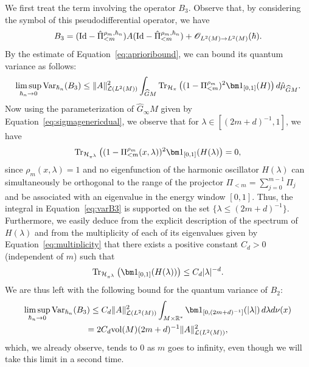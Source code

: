 \documentclass[12pt,a4paper]{amsart}
\theoremstyle{plain}
\theoremstyle{definition}
\theoremstyle{remark}
\numberwithin{equation}{section}
\theoremstyle{definition}
\def\R{{\mathbb R}}%
\def \O{\mathscr{O}}
\def \Ghat{\widehat{G}}
\numberwithin{equation}{section}
\begin{document}
We first treat the term involving the operator $B_3$.
Observe that, by considering the symbol of this pseudodifferential operator, we have
\begin{equation*}
    B_3 = ({\rm Id}-\hat{\Pi}_{<m}^{\rho_m,\hbar_n})A({\rm Id}-\hat{\Pi}_{<m}^{\rho_m,\hbar_n}) + \O_{L^2(M)\rightarrow L^2(M)}(\hbar).
\end{equation*}
By the estimate of Equation~\eqref{eq:aprioribound}, we can bound its quantum variance as follows:
\begin{equation}
    \label{eq:varB3}
    \limsup_{\hbar_n\rightarrow 0}{\rm Var}_{\hbar_n}(B_3)
    \leq \|A\|_{\mathcal{L}(L^2(M))}^2\int_{\Ghat M} {\rm Tr}_{\mathcal{H}_\pi}\left((1-\Pi_{<m}^{\rho_m})^2{\bm 1}_{[0,1]}(H)\right)d\hat{\mu}_{\Ghat M}.
\end{equation}
Now using the parameterization of $\Ghat_\infty M$ given by Equation~\eqref{eq:sigmagenericdual}, we observe that for $\lambda\in [(2m+d)^{-1},1]$, we have
\begin{equation*}
    {\rm Tr}_{\mathcal{H}_{\pi^\lambda}}\left((1-\Pi_{<m}^{\rho_m}(x,\lambda))^2{\bm 1}_{[0,1]}(H(\lambda)\right) = 0,
\end{equation*}
since $\rho_m(x,\lambda) = 1$ and no eigenfunction of the harmonic oscillator $H(\lambda)$ can simultaneously be orthogonal to the range of the projector $\Pi_{<m} = \sum_{j=0}^{m-1}\Pi_j$ and be associated with an eigenvalue in the energy window $[0,1]$. Thus, the integral in Equation~\eqref{eq:varB3} is supported on the set $\{\lambda\leq (2m+d)^{-1}\}$. Furthermore, we easily deduce from the explicit description of the spectrum of $H(\lambda)$ and from the multiplicity of each of its eigenvalues given by Equation~\eqref{eq:multiplicity} that there exists a positive constant $C_d>0$ (independent of $m$) such that
\begin{equation}
    \label{eq:estimatetraceH}
    {\rm Tr}_{\mathcal{H}_{\pi^\lambda}}\left({\bm 1}_{[0,1]}(H(\lambda))\right)\leq C_d |\lambda|^{-d}.
\end{equation}
We are thus left with the following bound for the quantum variance of $B_2$:
\begin{multline}
    \label{eq:firstestimateB3}
    \limsup_{\hbar_n\rightarrow 0}{\rm Var}_{\hbar_n}(B_3)\leq C_d \|A\|_{\mathcal{L}(L^2(M))}^2\int_{M\times \R^*} {\bm 1}_{[0,(2m+d)^{-1}]}(|\lambda|)\,d\lambda d\nu(x)\\
    =  2C_d{\rm vol}(M)(2m+d)^{-1} \|A\|_{\mathcal{L}(L^2(M))}^2,
\end{multline}
which, we already observe, tends to $0$ as $m$ goes to infinity, even though we will take this limit in a second time.
    
\end{document}
